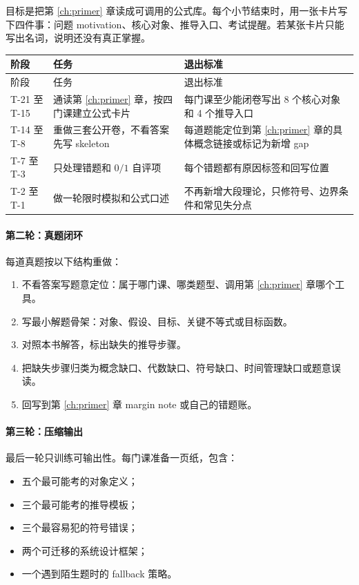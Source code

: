 目标是把第 \ref{ch:primer} 章读成可调用的公式库。每个小节结束时，用一张卡片写下四件事：问题 motivation、核心对象、推导入口、考试提醒。若某张卡片只能写出名词，说明还没有真正掌握。

\begingroup
\small
\begin{longtable}{L{0.18\textwidth}L{0.36\textwidth}L{0.36\textwidth}}
\toprule
阶段 & 任务 & 退出标准 \\
\midrule
\endfirsthead
\toprule
阶段 & 任务 & 退出标准 \\
\midrule
\endhead
T-21 至 T-15 & 通读第 \ref{ch:primer} 章，按四门课建立公式卡片 & 每门课至少能闭卷写出 8 个核心对象和 4 个推导入口 \\
T-14 至 T-8 & 重做三套公开卷，不看答案先写 skeleton & 每道题能定位到第 \ref{ch:primer} 章的具体概念链接或标记为新增 gap \\
T-7 至 T-3 & 只处理错题和 \(0/1\) 自评项 & 每个错题都有原因标签和回写位置 \\
T-2 至 T-1 & 做一轮限时模拟和公式口述 & 不再新增大段理论，只修符号、边界条件和常见失分点 \\
\bottomrule
\end{longtable}
\endgroup

\paragraph{第二轮：真题闭环}

每道真题按以下结构重做：

\begin{enumerate}
  \item 不看答案写题意定位：属于哪门课、哪类题型、调用第 \ref{ch:primer} 章哪个工具。
  \item 写最小解题骨架：对象、假设、目标、关键不等式或目标函数。
  \item 对照本书解答，标出缺失的推导步骤。
  \item 把缺失步骤归类为概念缺口、代数缺口、符号缺口、时间管理缺口或题意误读。
  \item 回写到第 \ref{ch:primer} 章 margin note 或自己的错题账。
\end{enumerate}

\paragraph{第三轮：压缩输出}

最后一轮只训练可输出性。每门课准备一页纸，包含：

\begin{itemize}
  \item 五个最可能考的对象定义；
  \item 三个最可能考的推导模板；
  \item 三个最容易犯的符号错误；
  \item 两个可迁移的系统设计框架；
  \item 一个遇到陌生题时的 fallback 策略。
\end{itemize}

